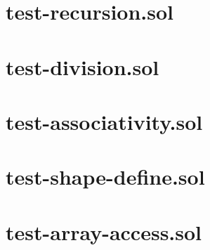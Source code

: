 \section{test-recursion.sol}


\section{test-division.sol}


\section{test-associativity.sol}


\section{test-shape-define.sol}


\section{test-array-access.sol}


